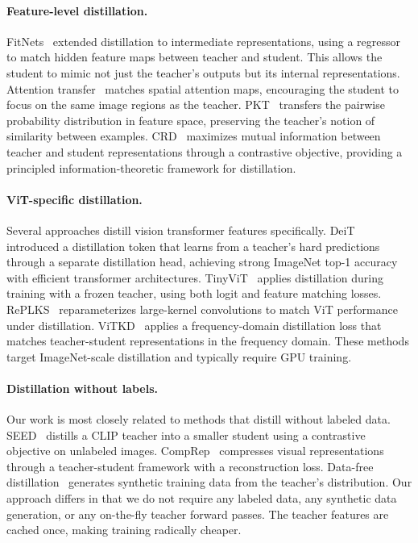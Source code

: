 \documentclass{article}
\begin{document}
\paragraph{Feature-level distillation.} FitNets~\cite{fitnets} extended distillation to intermediate representations, using a regressor to match hidden feature maps between teacher and student. This allows the student to mimic not just the teacher's outputs but its internal representations. Attention transfer~\cite{attn_transfer} matches spatial attention maps, encouraging the student to focus on the same image regions as the teacher. PKT~\cite{pkt} transfers the pairwise probability distribution in feature space, preserving the teacher's notion of similarity between examples. CRD~\cite{crd} maximizes mutual information between teacher and student representations through a contrastive objective, providing a principled information-theoretic framework for distillation.

\paragraph{ViT-specific distillation.} Several approaches distill vision transformer features specifically. DeiT~\cite{deit} introduced a distillation token that learns from a teacher's hard predictions through a separate distillation head, achieving strong ImageNet top-1 accuracy with efficient transformer architectures. TinyViT~\cite{tinyvit} applies distillation during training with a frozen teacher, using both logit and feature matching losses. RePLKS~\cite{replksim} reparameterizes large-kernel convolutions to match ViT performance under distillation. ViTKD~\cite{vitkd} applies a frequency-domain distillation loss that matches teacher-student representations in the frequency domain. These methods target ImageNet-scale distillation and typically require GPU training.

\paragraph{Distillation without labels.} Our work is most closely related to methods that distill without labeled data. SEED~\cite{seed} distills a CLIP teacher into a smaller student using a contrastive objective on unlabeled images. CompRep~\cite{comprep} compresses visual representations through a teacher-student framework with a reconstruction loss. Data-free distillation~\cite{datafree} generates synthetic training data from the teacher's distribution. Our approach differs in that we do not require any labeled data, any synthetic data generation, or any on-the-fly teacher forward passes. The teacher features are cached once, making training radically cheaper.
\end{document}
